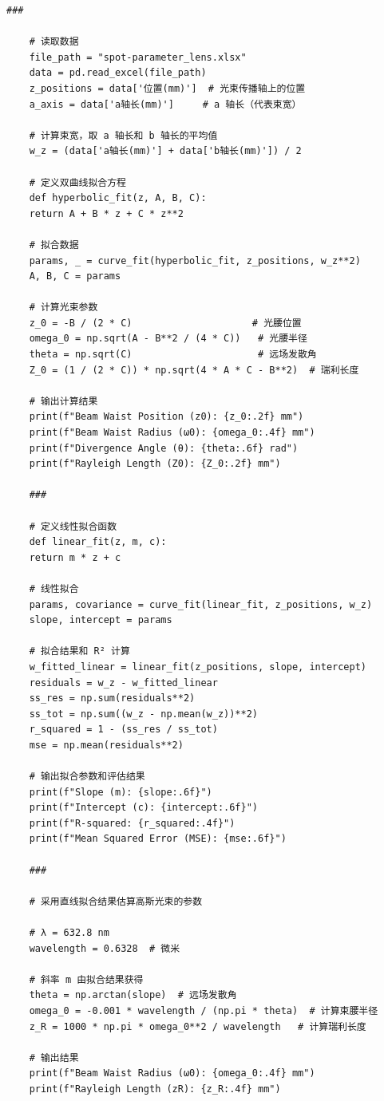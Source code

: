 \begin{lstlisting}[style=pythonstyle,caption=其它计算代码]
	###
	
	# 读取数据
	file_path = "spot-parameter_lens.xlsx"
	data = pd.read_excel(file_path)
	z_positions = data['位置(mm)']  # 光束传播轴上的位置
	a_axis = data['a轴长(mm)']     # a 轴长（代表束宽）
	
	# 计算束宽，取 a 轴长和 b 轴长的平均值
	w_z = (data['a轴长(mm)'] + data['b轴长(mm)']) / 2
	
	# 定义双曲线拟合方程
	def hyperbolic_fit(z, A, B, C):
	return A + B * z + C * z**2
	
	# 拟合数据
	params, _ = curve_fit(hyperbolic_fit, z_positions, w_z**2)
	A, B, C = params
	
	# 计算光束参数
	z_0 = -B / (2 * C)                     # 光腰位置
	omega_0 = np.sqrt(A - B**2 / (4 * C))   # 光腰半径
	theta = np.sqrt(C)                      # 远场发散角
	Z_0 = (1 / (2 * C)) * np.sqrt(4 * A * C - B**2)  # 瑞利长度
	
	# 输出计算结果
	print(f"Beam Waist Position (z0): {z_0:.2f} mm")
	print(f"Beam Waist Radius (ω0): {omega_0:.4f} mm")
	print(f"Divergence Angle (θ): {theta:.6f} rad")
	print(f"Rayleigh Length (Z0): {Z_0:.2f} mm")
	
	###
	
	# 定义线性拟合函数
	def linear_fit(z, m, c):
	return m * z + c
	
	# 线性拟合
	params, covariance = curve_fit(linear_fit, z_positions, w_z)
	slope, intercept = params
	
	# 拟合结果和 R² 计算
	w_fitted_linear = linear_fit(z_positions, slope, intercept)
	residuals = w_z - w_fitted_linear
	ss_res = np.sum(residuals**2)
	ss_tot = np.sum((w_z - np.mean(w_z))**2)
	r_squared = 1 - (ss_res / ss_tot)
	mse = np.mean(residuals**2)
	
	# 输出拟合参数和评估结果
	print(f"Slope (m): {slope:.6f}")
	print(f"Intercept (c): {intercept:.6f}")
	print(f"R-squared: {r_squared:.4f}")
	print(f"Mean Squared Error (MSE): {mse:.6f}")
	
	###
	
	# 采用直线拟合结果估算高斯光束的参数
	
	# λ = 632.8 nm
	wavelength = 0.6328  # 微米
	
	# 斜率 m 由拟合结果获得
	theta = np.arctan(slope)  # 远场发散角
	omega_0 = -0.001 * wavelength / (np.pi * theta)  # 计算束腰半径
	z_R = 1000 * np.pi * omega_0**2 / wavelength   # 计算瑞利长度
	
	# 输出结果
	print(f"Beam Waist Radius (ω0): {omega_0:.4f} mm")
	print(f"Rayleigh Length (zR): {z_R:.4f} mm")
	

\end{lstlisting}
